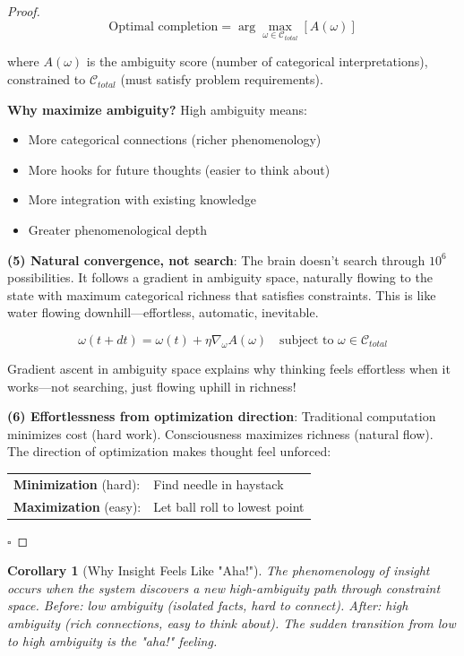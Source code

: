 \documentclass[11pt,a4paper]{article}
\newtheorem{corollary}[theorem]{Corollary}
\begin{document}
\begin{proof}
\begin{equation}
\text{Optimal completion} = \arg\max_{\omega \in \mathcal{C}_{total}} \left[ A(\omega) \right]
\end{equation}

where $A(\omega)$ is the ambiguity score (number of categorical interpretations), constrained to $\mathcal{C}_{total}$ (must satisfy problem requirements).

\textbf{Why maximize ambiguity?} High ambiguity means:
\begin{itemize}
\item More categorical connections (richer phenomenology)
\item More hooks for future thoughts (easier to think about)
\item More integration with existing knowledge
\item Greater phenomenological depth
\end{itemize}

\textbf{(5) Natural convergence, not search}: The brain doesn't search through $10^6$ possibilities. It follows a gradient in ambiguity space, naturally flowing to the state with maximum categorical richness that satisfies constraints. This is like water flowing downhill—effortless, automatic, inevitable.

\begin{equation}
\omega(t+dt) = \omega(t) + \eta \nabla_\omega A(\omega) \quad \text{subject to } \omega \in \mathcal{C}_{total}
\end{equation}

Gradient ascent in ambiguity space explains why thinking feels effortless when it works—not searching, just flowing uphill in richness!

\textbf{(6) Effortlessness from optimization direction}: Traditional computation minimizes cost (hard work). Consciousness maximizes richness (natural flow). The direction of optimization makes thought feel unforced:

\begin{center}
\begin{tabular}{ll}
\textbf{Minimization} (hard): & Find needle in haystack \\
\textbf{Maximization} (easy): & Let ball roll to lowest point
\end{tabular}
\end{center}

$\square$
\end{proof}

\begin{corollary}[Why Insight Feels Like "Aha!"]
The phenomenology of insight occurs when the system discovers a new high-ambiguity path through constraint space. Before: low ambiguity (isolated facts, hard to connect). After: high ambiguity (rich connections, easy to think about). The sudden transition from low to high ambiguity \textit{is} the "aha!" feeling.
\end{corollary}
\end{document}
